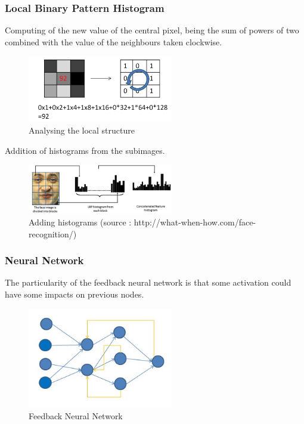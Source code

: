 \subsubsection{Local Binary Pattern Histogram}

Computing of the new value of the central pixel, being the sum of powers of two combined with the value of the neighbours taken clockwise.
\begin{figure}[ht]
\centering
\includegraphics[width=2.5in]{rsrc/LBPH1.jpg}
\caption{Analysing the local structure}
\label{Local Structure}
\end{figure}

Addition of histograms from the subimages.

\begin{figure}[ht]
\centering
\includegraphics[width=2.5in]{rsrc/LBPH2.png}
\caption{Adding histograms (source : http://what-when-how.com/face-recognition/)}
\label{Adding histograms}
\end{figure}

\subsubsection{Neural Network}

The particularity of the feedback neural network is that some activation could have some impacts on previous nodes.
\begin{figure}[ht]
\centering
\includegraphics[width=2.5in]{rsrc/feedback_network.jpg}
\caption{Feedback Neural Network}
\label{Feedback Neural Network}
\end{figure}



